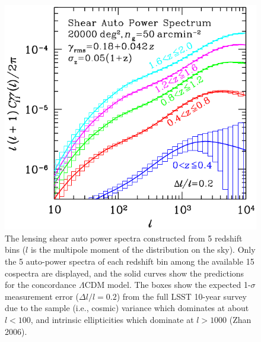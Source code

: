 \documentclass{emulateapj}
\begin{document}
\begin{figure}
\includegraphics[width=1.0\hsize,clip]{cls.pdf}
\caption{The lensing shear auto power spectra constructed from 5 redshift bins 
($l$ is the multipole moment of the distribution on the sky). Only the 5 auto-power 
spectra of each redshift bin among the available 15 cospectra are displayed, and the 
solid curves show the predictions for the concordance $\Lambda$CDM model. The boxes 
show the expected 1-$\sigma$ measurement error ($\Delta l/l=0.2$) from the full LSST 
10-year survey due to the sample (i.e., cosmic) variance which dominates at about 
$l< 100$, and intrinsic ellipticities which dominate at $l> 1000$ (Zhan 2006).} 
\label{Fig:wlPk}
\end{figure}
\end{document}

